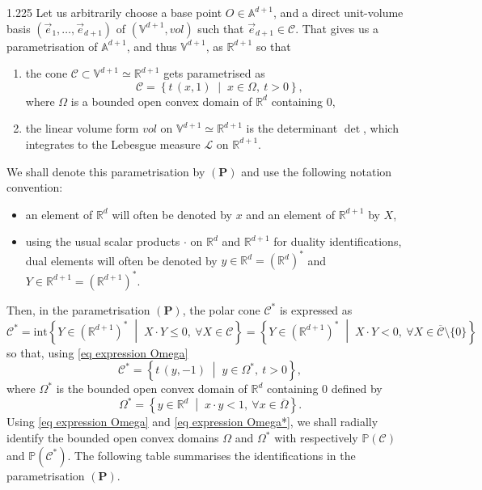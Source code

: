 \documentclass[reqno, a4paper]{amsart}
\numberwithin{equation}{section}
\numberwithin{figure}{section}
\theoremstyle{definition}
\theoremstyle{remark}
\newcommand{\R}{\mathbb{R}} %
\newcommand{\V}{\mathbb{V}} %
\newcommand{\A}{\mathbb{A}} %
\renewcommand{\P}{\mathbb{P}} %
\newcommand{\C}{\mathcal{C}} %
\newcommand{\linvol}{\mathit{vol}} %
\newcommand{\st}{\; \middle\vert \;} %
\begin{document}
\begin{spacing}{1.225}
Let us arbitrarily choose a base point $O \in \A^{d+1}$, and a direct unit-volume basis $(\vec{e}_1, \dots, \vec{e}_{d+1})$ of $(\V^{d+1},\linvol)$ such that $\vec{e}_{d+1} \in \C$. That gives us a parametrisation of $\A^{d+1}$, and thus $\V^{d+1}$, as $\R^{d+1}$ so that 
\begin{enumerate}[label=($\mathbf{P}$\arabic*)]
\item the cone $\C \subset \V^{d+1}\simeq \R^{d+1}$ gets parametrised as
 \begin{equation}
 \label{eq expression Omega}
 \C = \left\lbrace t \, (x,1) \st x \in \Omega, \ t>0 \right\rbrace ,
 \end{equation}
where $\Omega$ is a bounded open convex domain of $\R^d$ containing $0$,
\item the linear volume form $\linvol$ on $\V^{d+1} \simeq \R^{d+1}$ is the determinant $\det$, which integrates to the Lebesgue measure $\mathcal{L}$ on $\R^{d+1}$.
\end{enumerate}
We shall denote this parametrisation by $(\mathbf{P})$ and use the following notation convention:
\begin{itemize}
\item an element of $\R^d$ will often be denoted by $x$ and an element of $\R^{d+1}$ by $X$,
\item using the usual scalar products $\cdot$ on $\R^d$ and $\R^{d+1}$ for duality identifications, dual elements will often be denoted by $y \in \R^d = (\R^d)^*$ and $Y \in \R^{d+1} = (\R^{d+1})^*$. 
\end{itemize} 
Then, in the parametrisation $(\mathbf{P})$, the polar cone $\C^*$ is expressed as 
\begin{equation*}
\C^*  = \mathrm{int} \left\lbrace Y \in (\R^{d+1})^* \st X\cdot Y \leq 0, \ \forall X \in \C\right\rbrace = \left\lbrace Y \in (\R^{d+1})^* \st X\cdot Y<0, \ \forall X \in \overline{\C} \setminus \{0\} \right\rbrace 
\end{equation*}
so that, using \eqref{eq expression Omega}
\begin{equation}
 \label{eq expression Omega*}
\C^* = \left\lbrace t \,(y,-1) \st y \in \Omega^*, \ t>0 \right\rbrace ,
\end{equation}
where $\Omega^*$ is the bounded open convex domain of $\R^d$ containing $0$ defined by
\begin{equation*}
\Omega^* = \left\lbrace y \in \R^d \st x \cdot y < 1 , \ \forall x \in \overline{\Omega} \right\rbrace. 
\end{equation*}
Using \eqref{eq expression Omega} and \eqref{eq expression Omega*}, we shall radially identify the bounded open convex domains $\Omega$ and $\Omega^*$ with respectively $\P(\C)$ and $\P(\C^*)$. The following table summarises the identifications in the parametrisation $(\mathbf{P})$.


\end{spacing}
\end{document}
